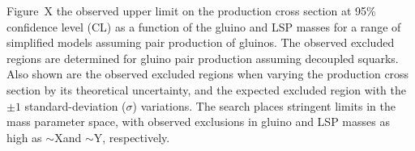 Figure~X  
the observed upper limit on the
production cross section at 95\% confidence level (CL) as a function
of the gluino and LSP masses for a range of simplified models assuming
pair production of gluinos. The observed excluded regions are
determined for gluino pair production assuming decoupled squarks. Also
shown are the observed excluded regions when varying the production
cross section by its theoretical uncertainty, and the expected
excluded region with the ${\pm}1$ standard-deviation ($\sigma$)
variations. The search places stringent limits in the mass parameter
space, with observed exclusions in gluino and LSP masses as high as
$\sim$X\gev and $\sim$Y\gev, respectively.

